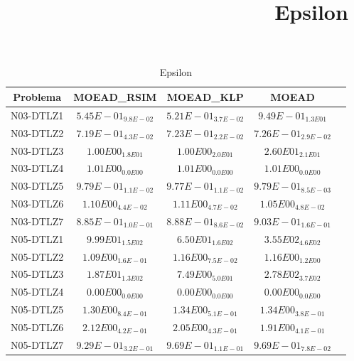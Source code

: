 \documentclass{article}
\title{Epsilon}
\author{}
\begin{document}
\maketitle
\begin{table*}[ht!]
\scriptsize
\caption{Epsilon}
\centering\begin{tabular}{|c||c||c||c||c|} \hline
Problema &MOEAD_RSIM &MOEAD_KLP &MOEAD\\\hline
N03-DTLZ1 &\cellcolor{gray25}$5.45E-01_{9.8E-02}$ &\cellcolor{gray95}$5.21E-01_{3.7E-02}$ &$9.49E-01_{1.3E01}$\\ 
\hline
N03-DTLZ2 &\cellcolor{gray95}$7.19E-01_{4.3E-02}$ &\cellcolor{gray25}$7.23E-01_{2.2E-02}$ &$7.26E-01_{2.9E-02}$\\ 
\hline
N03-DTLZ3 &\cellcolor{gray95}$1.00E00_{1.8E01}$ &\cellcolor{gray25}$1.00E00_{2.0E01}$ &$2.60E01_{2.1E01}$\\ 
\hline
N03-DTLZ4 &\cellcolor{gray95}$1.01E00_{0.0E00}$ &\cellcolor{gray25}$1.01E00_{0.0E00}$ &$1.01E00_{0.0E00}$\\ 
\hline
N03-DTLZ5 &$9.79E-01_{1.1E-02}$ &\cellcolor{gray95}$9.77E-01_{1.1E-02}$ &\cellcolor{gray25}$9.79E-01_{8.5E-03}$\\ 
\hline
N03-DTLZ6 &\cellcolor{gray25}$1.10E00_{4.4E-02}$ &$1.11E00_{4.7E-02}$ &\cellcolor{gray95}$1.05E00_{4.8E-02}$\\ 
\hline
N03-DTLZ7 &\cellcolor{gray95}$8.85E-01_{1.0E-01}$ &\cellcolor{gray25}$8.88E-01_{8.6E-02}$ &$9.03E-01_{1.6E-01}$\\ 
\hline
N05-DTLZ1 &\cellcolor{gray25}$9.99E01_{1.5E02}$ &\cellcolor{gray95}$6.50E01_{1.6E02}$ &$3.55E02_{4.6E02}$\\ 
\hline
N05-DTLZ2 &\cellcolor{gray95}$1.09E00_{1.6E-01}$ &\cellcolor{gray25}$1.16E00_{7.5E-02}$ &$1.16E00_{1.2E00}$\\ 
\hline
N05-DTLZ3 &\cellcolor{gray25}$1.87E01_{1.3E02}$ &\cellcolor{gray95}$7.49E00_{5.0E01}$ &$2.78E02_{3.7E02}$\\ 
\hline
N05-DTLZ4 &\cellcolor{gray95}$0.00E00_{0.0E00}$ &\cellcolor{gray25}$0.00E00_{0.0E00}$ &$0.00E00_{0.0E00}$\\ 
\hline
N05-DTLZ5 &\cellcolor{gray95}$1.30E00_{8.4E-01}$ &$1.34E00_{5.1E-01}$ &\cellcolor{gray25}$1.34E00_{3.8E-01}$\\ 
\hline
N05-DTLZ6 &$2.12E00_{4.2E-01}$ &\cellcolor{gray25}$2.05E00_{4.3E-01}$ &\cellcolor{gray95}$1.91E00_{4.1E-01}$\\ 
\hline
N05-DTLZ7 &\cellcolor{gray95}$9.29E-01_{3.2E-01}$ &$9.69E-01_{1.1E-01}$ &\cellcolor{gray25}$9.69E-01_{7.8E-02}$\\ 

\end{tabular}
\end{table*}
\end{document}
